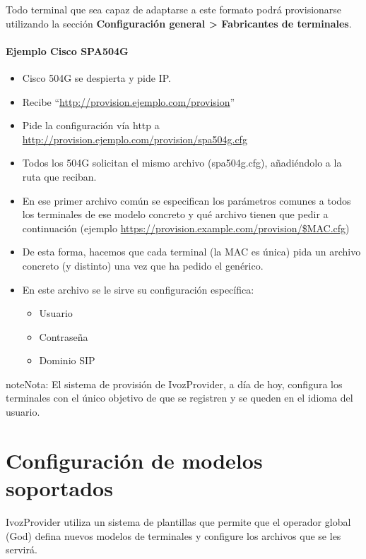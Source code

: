 \documentclass[letterpaper,10pt,spanish]{sphinxmanual}
\begin{document}
Todo terminal que sea capaz de adaptarse a este formato podrá provisionarse utilizando la sección \textbf{Configuración general \textgreater{} Fabricantes de terminales}.
\paragraph{Ejemplo Cisco SPA504G}
\begin{itemize}
\item {} 
Cisco 504G se despierta y pide IP.

\item {} 
Recibe “\url{http://provision.ejemplo.com/provision}”

\item {} 
Pide la configuración vía http a \url{http://provision.ejemplo.com/provision/spa504g.cfg}

\item {} 
Todos los 504G solicitan el mismo archivo (spa504g.cfg), añadiéndolo a la ruta que reciban.

\item {} 
En ese primer archivo común se especifican los parámetros comunes a todos los terminales de ese modelo concreto y qué archivo tienen que pedir a continuación (ejemplo \url{https://provision.example.com/provision/\$MAC.cfg})

\item {} 
De esta forma, hacemos que cada terminal (la MAC es única) pida un archivo concreto (y distinto) una vez que ha pedido el genérico.

\item {} 
En este archivo se le sirve su configuración específica:
\begin{itemize}
\item {} 
Usuario

\item {} 
Contraseña

\item {} 
Dominio SIP

\end{itemize}

\end{itemize}

\begin{notice}{note}{Nota:}
El sistema de provisión de IvozProvider, a día de hoy, configura los terminales con el único objetivo de que se registren y se queden en el idioma del usuario.
\end{notice}


\section{Configuración de modelos soportados}
\label{provisioning/index:configuration-of-supported-models}
IvozProvider utiliza un sistema de plantillas que permite que el operador global (God) defina nuevos modelos de terminales y configure los archivos que se les servirá.
\end{document}
